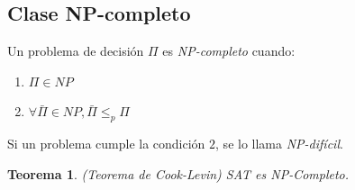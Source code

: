 \documentclass[a4paper]{report}
\newtheorem*{theorem*}{Teorema}
\begin{document}
\subsection{Clase NP-completo}

Un problema de decisión $\Pi$ es \textit{NP-completo} cuando:
\begin{enumerate}
    \item $\Pi \in NP$
    \item $\forall \bar{\Pi} \in NP, \bar{\Pi} \leq_p \Pi$
\end{enumerate}

Si un problema cumple la condición $2$, se lo llama \textit{NP-difícil}.

\begin{theorem*}
    (Teorema de Cook-Levin) \textsc{SAT} es NP-Completo.
\end{theorem*}
\end{document}
